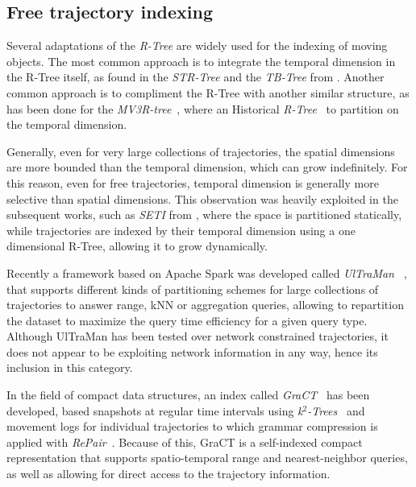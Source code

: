 \documentclass[a4paper,10pt,twoside]{book}
\begin{document}
	\subsection{Free trajectory indexing}
	Several adaptations of the {\em R-Tree} \cite{DBLP:conf/sigmod/Guttman84} are widely used for the indexing of moving objects. The most common approach is to integrate the temporal dimension in the R-Tree itself, as found in the {\em STR-Tree} and the {\em TB-Tree} from \cite{DBLP:conf/vldb/PfoserJT00}.
    Another common approach is to compliment the R-Tree with another similar structure, as has been done for the {\em MV3R-tree}~\cite{DBLP:conf/vldb/PapadiasT01},
    where an Historical {\em R-Tree}~\cite{nascimento1998towards} to partition on the temporal dimension.
    
    Generally, even for very large collections of trajectories, the spatial dimensions are more bounded than the temporal dimension, which can grow indefinitely. For this reason, even for free trajectories, temporal dimension is generally more selective than spatial dimensions. This observation was heavily exploited in the subsequent works, such as {\em SETI} from \cite{chakka2003indexing}, where the space is partitioned statically, while trajectories are indexed by their temporal dimension using a one dimensional R-Tree, allowing it to grow dynamically.
    
    Recently a framework based on Apache Spark was developed called {\em UlTraMan}~ \cite{ding2018ultraman}, that supports different kinds of partitioning schemes for large collections of trajectories to answer range, kNN or aggregation queries, allowing to repartition the dataset to maximize the query time efficiency for a given query type. Although UlTraMan has been tested over network constrained trajectories, it does not appear to be exploiting network information in any way, hence its inclusion in this category.
    
    In the field of compact data structures, an index called {\em GraCT}~\cite{brisaboa2019gract} has been developed, based snapshots at regular time intervals using {\em k$^2$-Trees}~\cite{brisaboa2009k} and movement logs for individual trajectories to which grammar compression is applied with {\em RePair}~\cite{larsson2000off}. Because of this, GraCT is a self-indexed compact representation that supports spatio-temporal range and nearest-neighbor queries, as well as allowing for direct access to the trajectory information.
	
\end{document}
